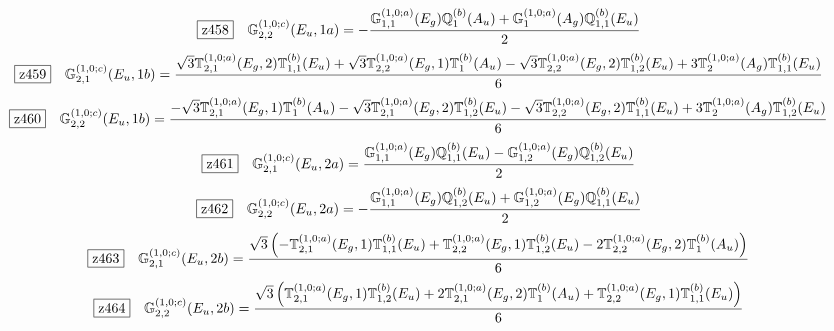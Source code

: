 \documentclass[fleqn,10pt,landscape]{jsarticle}
\begin{document}
\begin{dmath*}
\hspace*{3mm}\fbox{z458}\quad \mathbb{G}_{2,2}^{(1,0;c)}(E_{u},1a)=- \frac{\mathbb{G}_{1,1}^{(1,0;a)}(E_{g}) \mathbb{Q}_{1}^{(b)}(A_{u}) + \mathbb{G}_{1}^{(1,0;a)}(A_{g}) \mathbb{Q}_{1,1}^{(b)}(E_{u})}{2}
\end{dmath*}
\begin{dmath*}
\hspace*{3mm}\fbox{z459}\quad \mathbb{G}_{2,1}^{(1,0;c)}(E_{u},1b)=\frac{\sqrt{3} \mathbb{T}_{2,1}^{(1,0;a)}(E_{g},2) \mathbb{T}_{1,1}^{(b)}(E_{u}) + \sqrt{3} \mathbb{T}_{2,2}^{(1,0;a)}(E_{g},1) \mathbb{T}_{1}^{(b)}(A_{u}) - \sqrt{3} \mathbb{T}_{2,2}^{(1,0;a)}(E_{g},2) \mathbb{T}_{1,2}^{(b)}(E_{u}) + 3 \mathbb{T}_{2}^{(1,0;a)}(A_{g}) \mathbb{T}_{1,1}^{(b)}(E_{u})}{6}
\end{dmath*}
\begin{dmath*}
\hspace*{3mm}\fbox{z460}\quad \mathbb{G}_{2,2}^{(1,0;c)}(E_{u},1b)=\frac{- \sqrt{3} \mathbb{T}_{2,1}^{(1,0;a)}(E_{g},1) \mathbb{T}_{1}^{(b)}(A_{u}) - \sqrt{3} \mathbb{T}_{2,1}^{(1,0;a)}(E_{g},2) \mathbb{T}_{1,2}^{(b)}(E_{u}) - \sqrt{3} \mathbb{T}_{2,2}^{(1,0;a)}(E_{g},2) \mathbb{T}_{1,1}^{(b)}(E_{u}) + 3 \mathbb{T}_{2}^{(1,0;a)}(A_{g}) \mathbb{T}_{1,2}^{(b)}(E_{u})}{6}
\end{dmath*}
\begin{dmath*}
\hspace*{3mm}\fbox{z461}\quad \mathbb{G}_{2,1}^{(1,0;c)}(E_{u},2a)=\frac{\mathbb{G}_{1,1}^{(1,0;a)}(E_{g}) \mathbb{Q}_{1,1}^{(b)}(E_{u}) - \mathbb{G}_{1,2}^{(1,0;a)}(E_{g}) \mathbb{Q}_{1,2}^{(b)}(E_{u})}{2}
\end{dmath*}
\begin{dmath*}
\hspace*{3mm}\fbox{z462}\quad \mathbb{G}_{2,2}^{(1,0;c)}(E_{u},2a)=- \frac{\mathbb{G}_{1,1}^{(1,0;a)}(E_{g}) \mathbb{Q}_{1,2}^{(b)}(E_{u}) + \mathbb{G}_{1,2}^{(1,0;a)}(E_{g}) \mathbb{Q}_{1,1}^{(b)}(E_{u})}{2}
\end{dmath*}
\begin{dmath*}
\hspace*{3mm}\fbox{z463}\quad \mathbb{G}_{2,1}^{(1,0;c)}(E_{u},2b)=\frac{\sqrt{3} \left(- \mathbb{T}_{2,1}^{(1,0;a)}(E_{g},1) \mathbb{T}_{1,1}^{(b)}(E_{u}) + \mathbb{T}_{2,2}^{(1,0;a)}(E_{g},1) \mathbb{T}_{1,2}^{(b)}(E_{u}) - 2 \mathbb{T}_{2,2}^{(1,0;a)}(E_{g},2) \mathbb{T}_{1}^{(b)}(A_{u})\right)}{6}
\end{dmath*}
\begin{dmath*}
\hspace*{3mm}\fbox{z464}\quad \mathbb{G}_{2,2}^{(1,0;c)}(E_{u},2b)=\frac{\sqrt{3} \left(\mathbb{T}_{2,1}^{(1,0;a)}(E_{g},1) \mathbb{T}_{1,2}^{(b)}(E_{u}) + 2 \mathbb{T}_{2,1}^{(1,0;a)}(E_{g},2) \mathbb{T}_{1}^{(b)}(A_{u}) + \mathbb{T}_{2,2}^{(1,0;a)}(E_{g},1) \mathbb{T}_{1,1}^{(b)}(E_{u})\right)}{6}
\end{dmath*}
\end{document}
